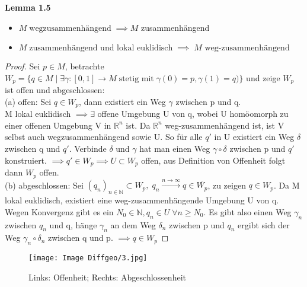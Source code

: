 \documentclass[fleqn, 12pt, letterpaper]{article}
\newcommand{\txt}[1]{\text{#1}}
\begin{document}
\textbf{Lemma 1.5}\begin{itemize}
	\item $M\;\txt{wegzusammenhängend}\;\implies M$ zusammenhängend
	\item $M \; \txt{zusammenhängend und lokal euklidisch}\; \implies \;M \txt{ weg-zusammenhängend}$
\end{itemize}
\begin{proof}
	Sei $p\in M$, betrachte $W_p=\{q\in M\;|\;\exists \gamma:[0,1]\rightarrow M \;\txt{stetig mit}\;\gamma(0)=p, \gamma(1)=q)\}$ und zeige $W_p$ ist offen und abgeschlossen:\\

	(a) offen: Sei $q\in W_p$, dann existiert ein Weg $\gamma$ zwischen p und q.\\
	M lokal euklidisch $\implies \exists$ offene Umgebung U von q, wobei U homöomorph zu einer offenen Umgebung V in $\mathbb{R}^n$ ist. Da $\mathbb{R}^n$ weg-zusammenhängend ist, ist V selbst auch wegzusammenhängend sowie U. So für alle $q'$ in U existiert ein Weg $\delta$ zwischen q und $q'$. Verbinde $\delta$ und $\gamma$ hat man einen Weg $\gamma \circ \delta$ zwischen p und $q'$ konstruiert. $\implies q'\in W_p \implies U \subset W_p$ offen, aus Definition von Offenheit folgt dann $W_p$ offen.\\
	
	(b) abgeschlossen: Sei $(q_n)_{n\in \mathbb{N}}\subset W_p, \;q_n\overset{n\rightarrow \infty}{\longrightarrow}q\in \overline{W_p}$, zu zeigen $q\in W_p$. Da M lokal euklidisch, existiert eine weg-zusammenhängende Umgebung U von q. Wegen Konvergenz gibt es ein $N_0\in\mathbb{N}, q_n\in U\; \forall n\geqslant N_0$. Es gibt also einen Weg $\gamma_n$ zwischen $q_n$ und q, hänge $\gamma_n$ an dem Weg $\delta_n$ zwischen p und $q_n$ ergibt sich der Weg $\gamma_n\circ\delta_n$ zwischen q und p. $\implies q\in W_p$
\end{proof}
\begin{figure}[H]
    \centering
    \texttt{[image: Image Diffgeo/3.jpg]}
	\caption{Links: Offenheit; Rechts: Abgeschlossenheit}
 \end{figure}
\end{document}
